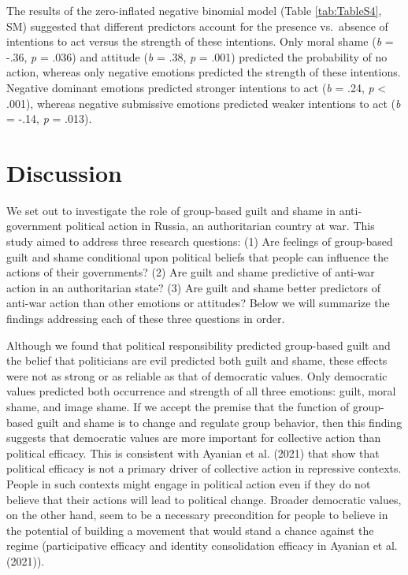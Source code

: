 \documentclass[
]{article}
\begin{document}
The results of the zero-inflated negative binomial model (Table \ref{tab:TableS4}, SM) suggested that different predictors account for the presence vs.~absence of intentions to act versus the strength of these intentions. Only moral shame (\emph{b} = -.36, \emph{p} = .036) and attitude (\emph{b} = .38, \emph{p} = .001) predicted the probability of no action, whereas only negative emotions predicted the strength of these intentions. Negative dominant emotions predicted stronger intentions to act (\emph{b} = .24, \emph{p} \textless{} .001), whereas negative submissive emotions predicted weaker intentions to act (\emph{b} = -.14, \emph{p} = .013).

\allsectionsfont{\centering}

\hypertarget{discussion}{%
\section*{Discussion}\label{discussion}}

We set out to investigate the role of group-based guilt and shame in anti-government political action in Russia, an authoritarian country at war. This study aimed to address three research questions: (1) Are feelings of group-based guilt and shame conditional upon political beliefs that people can influence the actions of their governments? (2) Are guilt and shame predictive of anti-war action in an authoritarian state? (3) Are guilt and shame better predictors of anti-war action than other emotions or attitudes? Below we will summarize the findings addressing each of these three questions in order.

Although we found that political responsibility predicted group-based guilt and the belief that politicians are evil predicted both guilt and shame, these effects were not as strong or as reliable as that of democratic values. Only democratic values predicted both occurrence and strength of all three emotions: guilt, moral shame, and image shame. If we accept the premise that the function of group-based guilt and shame is to change and regulate group behavior, then this finding suggests that democratic values are more important for collective action than political efficacy. This is consistent with Ayanian et al. (2021) that show that political efficacy is not a primary driver of collective action in repressive contexts. People in such contexts might engage in political action even if they do not believe that their actions will lead to political change. Broader democratic values, on the other hand, seem to be a necessary precondition for people to believe in the potential of building a movement that would stand a chance against the regime (participative efficacy and identity consolidation efficacy in Ayanian et al. (2021)).
\end{document}
